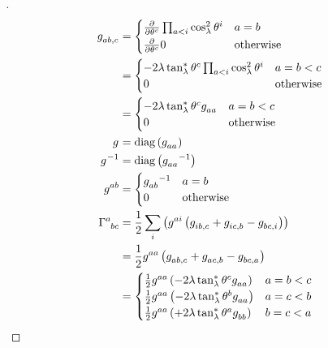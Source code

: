 \documentclass[../main.tex]{subfiles}
\begin{document}
\begin{proof}[]
\begin{align*}
\tensor{g}{_a_b_{,c}}
&=\begin{cases}
\frac{\partial}{\partial\tensor{\theta}{^c}}\prod_{a<i}{\cos_\lambda^2\tensor{\theta}{^i}}&\text{\(a=b\)}\\
\frac{\partial}{\partial\tensor{\theta}{^c}}0&\text{otherwise}\\
\end{cases}\\
&=\begin{cases}
-2\lambda\tan_\lambda^\ast\tensor{\theta}{^c}\prod_{a<i}{\cos_\lambda^2\tensor{\theta}{^i}}&\text{\(a=b<c\)}\\
0&\text{otherwise}\\
\end{cases}\\
&=\begin{cases}
-2\lambda\tan_\lambda^\ast\tensor{\theta}{^c}\tensor{g}{_a_a}&\text{\(a=b<c\)}\\
0&\text{otherwise}\\
\end{cases}\\
\tensor{g}{}
&=\diag\left(\tensor{g}{_a_a}\right)\\
{\tensor{g}{}}^{-1}
&=\diag\left({\tensor{g}{_a_a}}^{-1}\right)\\
\tensor{g}{^a^b}
&=\begin{cases}
{\tensor{g}{_a_b}}^{-1}&\text{\(a=b\)}\\
0&\text{otherwise}\\
\end{cases}\\
\tensor{\Gamma}{^a_b_c}
&=
\frac{1}{2}
\sum_{i}\left(
\tensor{g}{^a^i}
\left(
\tensor{g}{_i_b_{,c}}
+\tensor{g}{_i_c_{,b}}
-\tensor{g}{_b_c_{,i}}
\right)
\right)\\
&=
\frac{1}{2}
\tensor{g}{^a^a}
\left(
\tensor{g}{_a_b_{,c}}
+\tensor{g}{_a_c_{,b}}
-\tensor{g}{_b_c_{,a}}
\right)\\
&=\begin{cases}
\frac{1}{2}\tensor{g}{^a^a}\left(-2\lambda\tan_\lambda^\ast\tensor{\theta}{^c}\tensor{g}{_a_a}\right)&\text{\(a=b<c\)}\\
\frac{1}{2}\tensor{g}{^a^a}\left(-2\lambda\tan_\lambda^\ast\tensor{\theta}{^b}\tensor{g}{_a_a}\right)&\text{\(a=c<b\)}\\
\frac{1}{2}\tensor{g}{^a^a}\left(+2\lambda\tan_\lambda^\ast\tensor{\theta}{^a}\tensor{g}{_b_b}\right)&\text{\(b=c<a\)}\\

\end{cases}
\end{align*}
\end{proof}
\end{document}
